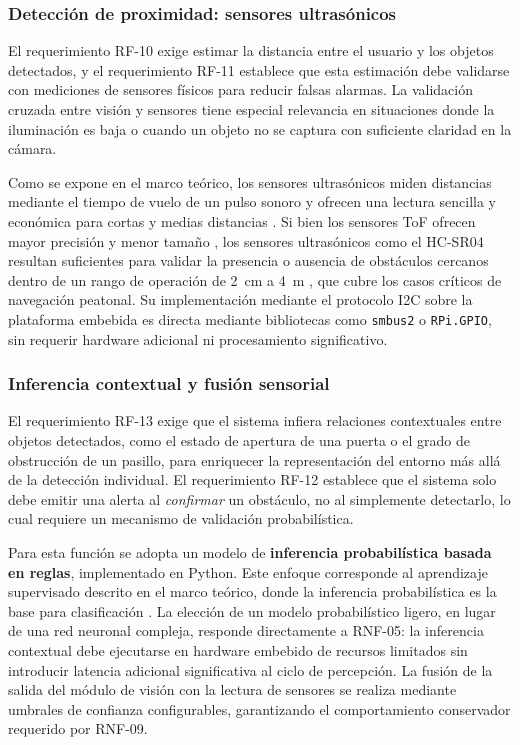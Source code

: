 \subsubsection{Detección de proximidad: sensores ultrasónicos}

El requerimiento RF-10 exige estimar la distancia entre el usuario y los objetos
detectados, y el requerimiento RF-11 establece que esta estimación debe validarse con
mediciones de sensores físicos para reducir falsas alarmas. La validación cruzada entre
visión y sensores tiene especial relevancia en situaciones donde la iluminación es baja
o cuando un objeto no se captura con suficiente claridad en la cámara.

Como se expone en el marco teórico, los sensores ultrasónicos miden distancias mediante
el tiempo de vuelo de un pulso sonoro y ofrecen una lectura sencilla y económica para
cortas y medias distancias \cite{hcsr04_datasheet}. Si bien los sensores ToF ofrecen
mayor precisión y menor tamaño \cite{vl53l1x_product}, los sensores ultrasónicos como
el HC-SR04 resultan suficientes para validar la presencia o ausencia de obstáculos
cercanos dentro de un rango de operación de 2~cm a 4~m \cite{hcsr04_datasheet}, que
cubre los casos críticos de navegación peatonal. Su implementación mediante el protocolo
I2C sobre la plataforma embebida es directa mediante bibliotecas como \texttt{smbus2}
o \texttt{RPi.GPIO}, sin requerir hardware adicional ni procesamiento significativo.

\subsubsection{Inferencia contextual y fusión sensorial}

El requerimiento RF-13 exige que el sistema infiera relaciones contextuales entre
objetos detectados, como el estado de apertura de una puerta o el grado de obstrucción
de un pasillo, para enriquecer la representación del entorno más allá de la detección
individual. El requerimiento RF-12 establece que el sistema solo debe emitir una alerta
al \emph{confirmar} un obstáculo, no al simplemente detectarlo, lo cual requiere un
mecanismo de validación probabilística.

Para esta función se adopta un modelo de \textbf{inferencia probabilística basada en
reglas}, implementado en Python. Este enfoque corresponde
al aprendizaje supervisado descrito en el marco teórico, donde la inferencia probabilística es la base para clasificación \cite{ibm2025_mltypes}. La elección de
un modelo probabilístico ligero, en lugar de una red neuronal compleja, responde
directamente a RNF-05: la inferencia contextual debe ejecutarse en hardware embebido
de recursos limitados sin introducir latencia adicional significativa al ciclo de
percepción. La fusión de la salida del módulo de visión con la lectura de sensores
se realiza mediante umbrales de confianza configurables, garantizando el comportamiento
conservador requerido por RNF-09.

